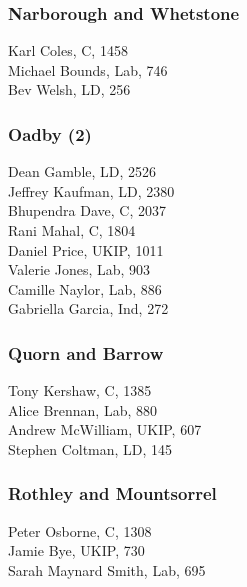 \documentclass[a4paper,openany,10pt]{book}
\begin{document}
\subsubsection*{Narborough and Whetstone}



Karl Coles, C, 1458\\
Michael Bounds, Lab, 746\\
Bev Welsh, LD, 256\\


\subsubsection*{Oadby (2)}



Dean Gamble, LD, 2526\\
Jeffrey Kaufman, LD, 2380\\
Bhupendra Dave, C, 2037\\
Rani Mahal, C, 1804\\
Daniel Price, UKIP, 1011\\
Valerie Jones, Lab, 903\\
Camille Naylor, Lab, 886\\
Gabriella Garcia, Ind, 272\\


\subsubsection*{Quorn and Barrow}



Tony Kershaw, C, 1385\\
Alice Brennan, Lab, 880\\
Andrew McWilliam, UKIP, 607\\
Stephen Coltman, LD, 145\\


\subsubsection*{Rothley and Mountsorrel}



Peter Osborne, C, 1308\\
Jamie Bye, UKIP, 730\\
{Sarah Maynard Smith}, Lab, 695\\
\end{document}
